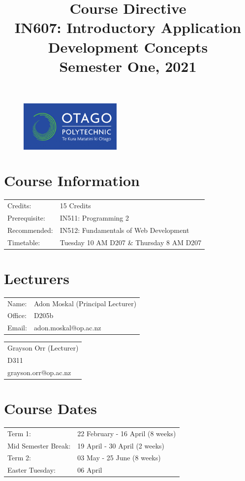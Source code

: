 \documentclass{article}
\author{}
\begin{document}
\begin{figure}
	\includegraphics[width=50mm]{./img/logo.png} 
\end{figure}

\title{Course Directive\\IN607: Introductory Application Development Concepts\\Semester One, 2021}
\date{}
\maketitle

\section*{Course Information}
\begin{tabular}{ll}
	Credits:            & 15 Credits                             \\
	Prerequisite:       & IN511: Programming 2                   \\
	Recommended:        & IN512: Fundamentals of Web Development \\
	Timetable:  & Tuesday 10 AM D207 \& Thursday 8 AM D207       
\end{tabular} 

\section*{Lecturers}
\begin{tabular}{ll}
	Name:   & Adon Moskal (Principal Lecturer) \\
	Office: & D205b                            \\
	Email:  & adon.moskal@op.ac.nz             \\
\end{tabular}
\begin{tabular}{l}
	Grayson Orr (Lecturer) \\
	D311                   \\
	grayson.orr@op.ac.nz   \\
\end{tabular}

\section*{Course Dates}
\begin{tabular}{ll}
	Term 1:             & 22 February - 16 April (8 weeks) \\
	Mid Semester Break: & 19 April - 30 April (2 weeks)    \\
	Term 2:             & 03 May - 25 June (8 weeks)        \\     
	Easter Tuesday:     & 06 April                             \\                 
\end{tabular}
\end{document}
